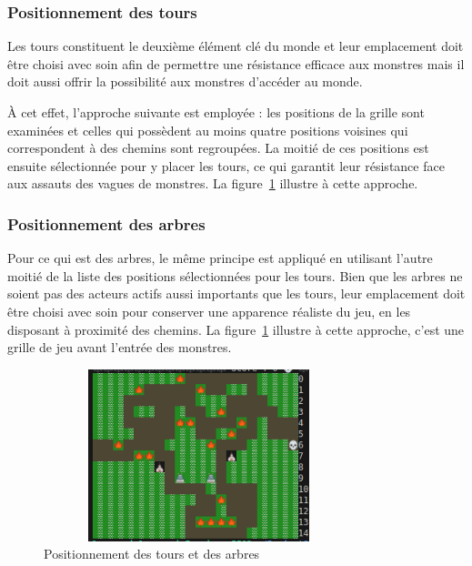 \documentclass[11pt]{article}
\begin{document}
            \subsubsection{Positionnement des tours}
            Les tours constituent le deuxième élément clé du monde et leur emplacement doit être choisi avec soin afin de permettre une résistance efficace aux monstres mais il doit aussi offrir la possibilité aux monstres d'accéder au monde. 
            
            À cet effet, l'approche suivante est employée : les positions de la grille sont examinées et celles qui possèdent au moins quatre positions voisines qui correspondent à des chemins sont regroupées. La moitié de ces positions est ensuite sélectionnée pour y placer les tours, ce qui garantit leur résistance face aux assauts des vagues de monstres. La figure~\ref{fig: positionnement } illustre à cette approche.

            \subsubsection{Positionnement des arbres}
            
            Pour ce qui est des arbres, le même principe est appliqué en utilisant l'autre moitié de la liste des positions sélectionnées pour les tours. Bien que les arbres ne soient pas des acteurs actifs aussi importants que les tours, leur emplacement doit être choisi avec soin pour conserver une apparence réaliste du jeu, en les disposant à proximité des chemins. La figure~\ref{fig: positionnement } illustre à cette approche, c'est une grille de jeu avant l'entrée des monstres. 

            \begin{figure}[h]
                \centering
                \includegraphics[height = 5cm, width = 9cm]{positionnement.png}
                \caption{Positionnement des tours et des arbres} 
                \label{fig: positionnement } 
            \end{figure}
            \newpage
\end{document}
